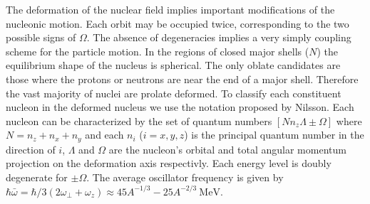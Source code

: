 \documentclass[10pt,a4paper, twoside, openright]{report}
\begin{document}
The deformation of the nuclear field implies important modifications of the nucleonic motion. Each orbit may be occupied twice, corresponding to the two possible signs of $\Omega$. The absence of degeneracies implies a very simply coupling scheme for the particle motion. In the regions of closed major shells ($N$) the equilibrium shape of the nucleus is spherical. The only oblate candidates are those where the protons or neutrons are near the end of a major shell. Therefore the vast majority of nuclei are prolate deformed. To classify each constituent nucleon in the deformed nucleus we use the notation proposed by Nilsson\cite{Nilsson1955, BohrMottVol2}. Each nucleon can be characterized by the set of quantum numbers $\left[N n_z \Lambda \pm\Omega\right]$ \cite{BohrMottVol2}  where $N = n_z + n_x + n_y$ and each $n_i$ ($i = x, y, z$) is the principal quantum number in the direction of $i$, $\Lambda$ and $\Omega$ are the nucleon's orbital and total angular momentum projection on the deformation axis respectivly. Each energy level is doubly degenerate for $\pm\Omega$. The average oscillator frequency is given by $\hbar\bar{\omega} = \hbar/3\left(2\omega_{\perp} + \omega_z\right) \approx 45A^{-1/3} - 25A^{-2/3} \ \text{MeV}$\cite{Brown2016}. 
\end{document}
